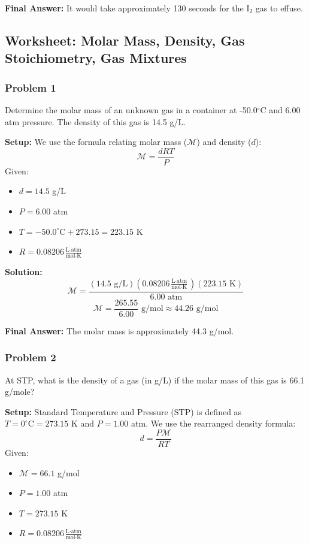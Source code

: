 \documentclass{article}
\begin{document}
\textbf{Final Answer:} It would take approximately 130 seconds for the I$_2$ gas to effuse.

\subsection{Worksheet: Molar Mass, Density, Gas Stoichiometry, Gas Mixtures}

\subsubsection{Problem 1}
Determine the molar mass of an unknown gas in a container at -50.0$^{\circ}$C and 6.00 atm pressure. The density of this gas is 14.5 g/L.

\textbf{Setup:}
We use the formula relating molar mass ($\mathcal{M}$) and density ($d$):
\[ \mathcal{M} = \frac{dRT}{P} \]
Given:
\begin{itemize}
    \item $d = 14.5$ g/L
    \item $P = 6.00$ atm
    \item $T = -50.0^{\circ}\text{C} + 273.15 = 223.15$ K
    \item $R = 0.08206 \frac{\text{L} \cdot \text{atm}}{\text{mol} \cdot \text{K}}$
\end{itemize}

\textbf{Solution:}
\[ \mathcal{M} = \frac{(14.5 \text{ g/L})(0.08206 \frac{\text{L} \cdot \text{atm}}{\text{mol} \cdot \text{K}})(223.15 \text{ K})}{6.00 \text{ atm}} \]
\[ \mathcal{M} = \frac{265.55}{6.00} \text{ g/mol} \approx 44.26 \text{ g/mol} \]

\textbf{Final Answer:} The molar mass is approximately 44.3 g/mol.

\subsubsection{Problem 2}
At STP, what is the density of a gas (in g/L) if the molar mass of this gas is 66.1 g/mole?

\textbf{Setup:}
Standard Temperature and Pressure (STP) is defined as $T = 0^{\circ}\text{C} = 273.15$ K and $P = 1.00$ atm. We use the rearranged density formula:
\[ d = \frac{P\mathcal{M}}{RT} \]
Given:
\begin{itemize}
    \item $\mathcal{M} = 66.1$ g/mol
    \item $P = 1.00$ atm
    \item $T = 273.15$ K
    \item $R = 0.08206 \frac{\text{L} \cdot \text{atm}}{\text{mol} \cdot \text{K}}$
\end{itemize}
\end{document}
